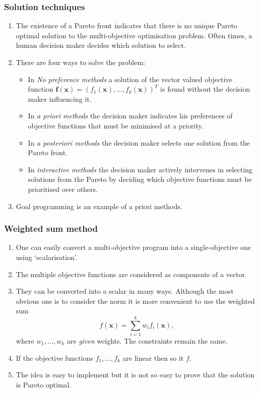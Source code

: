 \documentclass{beamer}
\begin{document}
\begin{frame}
\frametitle{Solution techniques}
\begin{enumerate}
\item The existence of a Pareto front indicates that there is no unique Pareto
optimal solution to the multi-objective optimisation problem. Often times, a 
human decision maker decides which solution to select.
\item There are four ways to solve the problem:
\begin{itemize}
\item In \emph{No preference methods} a solution of the vector valued objective
function $\bm{f}(\bm{x}) = (f_1(\bm{x}), \ldots, f_k(\bm{x}))^T$ is
found without the decision maker influencing it.
\item In \emph{a priori methods} the decision maker indicates his preferences of
objective functions that must be minimised at a priority.
\item In \emph{a posteriori methods} the decision maker selects one solution 
from the Pareto front.
\item In \emph{interactive methods} the decision maker actively intervenes in
selecting solutions from the Pareto by deciding which objective functions must
be prioritised over others.
\end{itemize}
\item Goal programming is an example of a priori methods.
\end{enumerate}
\end{frame}

\begin{frame}
\frametitle{Weighted sum method}
\begin{enumerate}
\item One can easily convert a multi-objective program into a single-objective
one using `scalarisation'.
\item The multiple objective functions are considered as components of a vector.
\item They can be converted into a scalar in many ways. Although the most 
obvious one is to consider the norm it is more convenient to use the weighted
sum
\[
f(\bm{x}) = \sum_{i=1}^k w_if_i(\bm{x}),
\]
where $w_1, \ldots, w_k$ are \emph{given} weights. The constraints remain the 
same.
\item If the objective functions $f_1, \ldots, f_k$ are linear then so it $f$.
\item The idea is easy to implement but it is not so easy to prove that the
solution is Pareto optimal.
\end{enumerate}
\end{frame}
\end{document}
